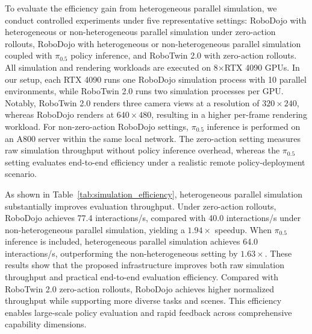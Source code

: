 To evaluate the efficiency gain from heterogeneous parallel simulation, we conduct controlled experiments under five representative settings: RoboDojo with heterogeneous or non-heterogeneous parallel simulation under zero-action rollouts, RoboDojo with heterogeneous or non-heterogeneous parallel simulation coupled with $\pi_{0.5}$ policy inference, and RoboTwin 2.0 with zero-action rollouts.
All simulation and rendering workloads are executed on 8$\times$RTX 4090 GPUs.
In our setup, each RTX 4090 runs one RoboDojo simulation process with 10 parallel environments, while RoboTwin 2.0 runs two simulation processes per GPU.
Notably, RoboTwin 2.0 renders three camera views at a resolution of $320 \times 240$, whereas RoboDojo renders at $640 \times 480$, resulting in a higher per-frame rendering workload.
For non-zero-action RoboDojo settings, $\pi_{0.5}$ inference is performed on an A800 server within the same local network.
The zero-action setting measures raw simulation throughput without policy inference overhead, whereas the $\pi_{0.5}$ setting evaluates end-to-end efficiency under a realistic remote policy-deployment scenario.

As shown in Table~\ref{tab:simulation_efficiency}, heterogeneous parallel simulation substantially improves evaluation throughput. 
Under zero-action rollouts, RoboDojo achieves 77.4 interactions/s, compared with 40.0 interactions/s under non-heterogeneous parallel simulation, yielding a $1.94\times$ speedup. 
When $\pi_{0.5}$ inference is included, heterogeneous parallel simulation achieves 64.0 interactions/s, outperforming the non-heterogeneous setting by $1.63\times$. 
These results show that the proposed infrastructure improves both raw simulation throughput and practical end-to-end evaluation efficiency. 
Compared with RoboTwin 2.0 zero-action rollouts, RoboDojo achieves higher normalized throughput while supporting more diverse tasks and scenes. 
This efficiency enables large-scale policy evaluation and rapid feedback across comprehensive capability dimensions.

